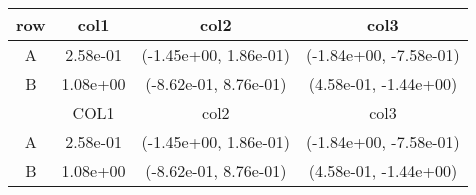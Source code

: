 \begin{tabular}{cccc}
\toprule
row&col1&col2&col3\tabularnewline
\midrule
A&2.58e-01& (-1.45e+00, 1.86e-01)& (-1.84e+00, -7.58e-01)\tabularnewline
B&1.08e+00& (-8.62e-01, 8.76e-01)& (4.58e-01, -1.44e+00)\tabularnewline
\midrule
&COL1&col2&col3\tabularnewline
\midrule
A&2.58e-01& (-1.45e+00, 1.86e-01)& (-1.84e+00, -7.58e-01)\tabularnewline
B&1.08e+00& (-8.62e-01, 8.76e-01)& (4.58e-01, -1.44e+00)\tabularnewline
\bottomrule
\end{tabular}
